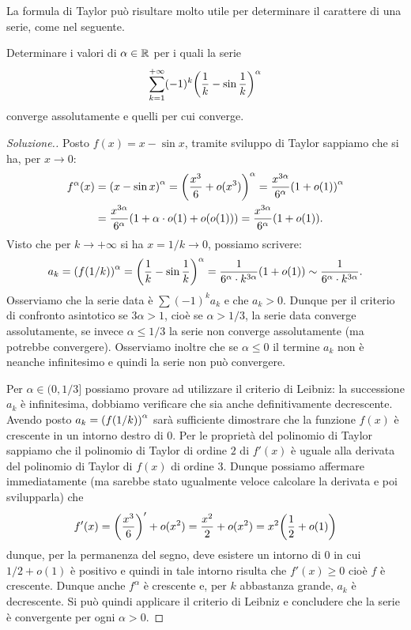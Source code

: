 La formula di Taylor può risultare molto utile per determinare il carattere di una serie, come nel seguente.
\begin{exercise}
Determinare i valori di $\alpha \in \mathbb R$ per i quali la serie
\[
  \sum_{k=1}^{+\infty}(-1)^k {\left( \frac 1 k - \sin \frac 1 k \right)}^\alpha
\]
converge assolutamente e quelli per cui converge.
\end{exercise}
\begin{proof}[Soluzione.]
Posto $f(x) = x - \sin x$,
tramite sviluppo di Taylor sappiamo che si ha,
per $x\to 0$:
\begin{align*}
   f^\alpha(x) &= {\left( x - \sin x \right)}^\alpha
   =  {\left( \frac{x^3}{6} + o(x^3) \right)}^\alpha
   = \frac{x^{3\alpha}}{6^\alpha}{\left( 1+o(1) \right)}^\alpha\\
   & = \frac{x^{3\alpha}}{6^\alpha}{\left( 1 + \alpha \cdot o(1) + o(o(1)) \right)}
   = \frac{x^{3\alpha}}{6^\alpha}{\left( 1 + o(1) \right)}.
\end{align*}
Visto che per $k\to +\infty$ si ha $x=1/k \to 0$, possiamo
scrivere:
\[
  a_k = {\left( f(1/k) \right)}^\alpha = {\left( \frac 1 k - \sin \frac 1 k \right)}^\alpha
  = \frac{1}{6^\alpha \cdot k^{3\alpha}} {\left( 1+o(1) \right)}
  \sim \frac{1}{6^\alpha \cdot k^{3\alpha}}.
\]
Osserviamo che la serie data è $\sum (-1)^k a_k$ e che $a_k>0$. Dunque per
il criterio di confronto asintotico se $3\alpha > 1$, cioè se $\alpha >1/3$,
la serie data converge assolutamente, se invece $\alpha \le 1/3$ la serie non
converge assolutamente (ma potrebbe convergere).
Osserviamo inoltre che se $\alpha \le 0$ il termine $a_k$ non è neanche
infinitesimo e quindi la serie non può convergere.

Per $\alpha \in (0,1/3]$ possiamo provare ad utilizzare il criterio di Leibniz:
la successione $a_k$ è infinitesima, dobbiamo verificare che sia anche
definitivamente decrescente.
Avendo posto $a_k = {\left( f(1/k) \right)}^\alpha$ sarà sufficiente dimostrare che
la funzione $f(x)$ è crescente in un intorno destro di $0$.
Per le proprietà del polinomio di Taylor sappiamo che il polinomio di Taylor
di ordine $2$ di $f'(x)$ è uguale alla derivata del polinomio di Taylor di
$f(x)$ di ordine $3$. Dunque possiamo affermare immediatamente (ma sarebbe
stato ugualmente veloce calcolare la derivata e poi svilupparla) che
\[
  f'(x)
  = {\left( \frac{x^3}{6} \right)}'  + o(x^2)
  = \frac{x^2}{2} + o(x^2) = x^2 {\left( \frac 1 2 + o(1) \right)}
\]
dunque, per la permanenza del segno, deve esistere un intorno di $0$ in cui
$1/2 + o(1)$ è positivo e quindi in tale intorno risulta che $f'(x)\ge 0$
cioè $f$ è crescente.
Dunque anche $f^\alpha$ è crescente e, per $k$ abbastanza grande,
$a_k$ è decrescente. Si può quindi applicare il criterio di Leibniz e
concludere che la serie è convergente per ogni $\alpha >0$.
\end{proof}


